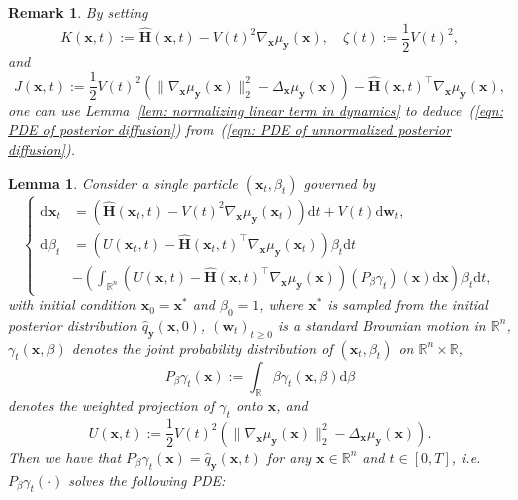 \documentclass{article}
\numberwithin{equation}{section}
\newtheorem{lemma}[theorem]{Lemma}
\newtheorem{remark}[theorem]{Remark}
\def\eqref#1{(\ref{#1})}
\newcommand{\dif}{{\mathrm{d}}}
\def\vw{{\bm{w}}}
\def\vx{{\bm{x}}}
\def\vy{{\bm{y}}}
\def\mH{{\bm{H}}}
\begin{document}
\begin{remark}
    By setting 
    $$
    K(\vx,t) := \widehat{\mH}(\vx,t)-V(t)^2\nabla_{\vx}\mu_{\vy}(\vx), \quad \zeta(t):=\frac{1}{2}V(t)^2,
    $$ 
    and 
    $$J(\vx,t) := \frac{1}{2}V(t)^2\left(\|\nabla_{\vx}\mu_{\vy}(\vx)\|_2^2 - \Delta_{\vx}\mu_{\vy}(\vx)\right) - \widehat{\mH}(\vx,t)^\intercal\nabla_{\vx}\mu_{\vy}(\vx),$$ 
    one can use Lemma~\ref{lem: normalizing linear term in dynamics} to deduce~\eqref{eqn: PDE of posterior diffusion} from~\eqref{eqn: PDE of unnormalized posterior diffusion}.     
\end{remark}

\begin{lemma}
    \label{lem: derivation of single particle dynamics}    
    Consider a single particle $(\vx_t,\beta_t)$ governed by
    \begin{equation}
    \label{eqn: PDE soln via single particle app} 
    \begin{cases}
    \dif \vx_t &= \left(\widehat{\mH}(\vx_t,t)-V(t)^2\nabla_{\vx}\mu_{\vy}(\vx_t)\right)\dif t + V(t)\dif \vw_t,\\
    \dif \beta_t &= \left(U(\vx_t,t) - \widehat{\mH}(\vx_t,t)^\intercal\nabla_{\vx}\mu_{\vy}(\vx_t)\right)\beta_t \dif t \\
    &- \left(\displaystyle\int_{\mathbb{R}^n}\left(U(\vx,t) - \widehat{\mH}(\vx,t)^\intercal\nabla_{\vx}\mu_{\vy}(\vx)\right)\left(P_{\beta}\gamma_t\right)(\vx)\dif \vx\right)\beta_t \dif t,    
    \end{cases}
    \end{equation}
    with initial condition $\vx_0 = \vx^\ast$ and $\beta_0 = 1$, where $\vx^\ast$ is sampled from the initial posterior distribution $\widehat{q}_{\vy}(\vx,0)$, $(\vw_t)_{t\geq 0}$ is a standard Brownian motion in $\mathbb{R}^n$, $\gamma_t(\vx,\beta)$ denotes the joint probability distribution of $(\vx_t,\beta_t)$ on $\mathbb{R}^n \times \mathbb{R}$, 
    $$
        P_{\beta}\gamma_t(\vx) := \int_{\mathbb{R}}\beta\gamma_{t}(\vx,\beta)\dif\beta
    $$ 
    denotes the weighted projection of $\gamma_t$ onto $\vx$, and 
    $$
        U(\vx,t) := \frac{1}{2}V(t)^2\left(\|\nabla_{\vx}\mu_{\vy}(\vx)\|_2^2-\Delta_{\vx}\mu_{\vy}(\vx)\right).
    $$ 
    Then we have that $P_{\beta}\gamma_t(\vx) = \widehat{q}_{\vy}(\vx,t)$ for any $\vx \in \mathbb{R}^n$ and $t \in [0,T]$, \emph{i.e.} $P_{\beta}\gamma_t(\cdot)$ solves the following PDE:

\end{lemma}
\end{document}
